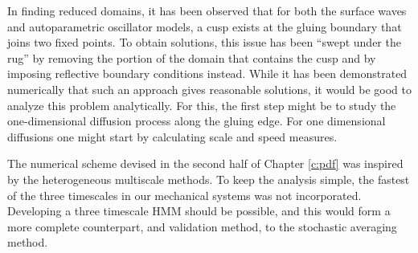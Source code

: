 In finding reduced domains, it has been observed that for both the surface waves and autoparametric oscillator models, a cusp exists at the gluing boundary that joins two fixed points. To obtain solutions, this issue has been ``swept under the rug'' by removing the portion of the domain that contains the cusp and by imposing reflective boundary conditions instead. While it has been demonstrated numerically that such an approach gives reasonable solutions, it would be good to analyze this problem analytically. For this, the first step might be to study the one-dimensional diffusion process along the gluing edge. For one dimensional diffusions one might start by calculating scale and speed measures\cite[\S 15.6]{karlin81:_secon_cours_stoch_proces}.

The numerical scheme devised in the second half of Chapter \ref{c:pdf} was inspired by the heterogeneous multiscale methods\citep{e05:_analy}. To keep the analysis simple, the fastest of the three timescales in our mechanical systems was not incorporated. Developing a three timescale HMM should be possible, and this would form a more complete counterpart, and validation method, to the stochastic averaging method.




